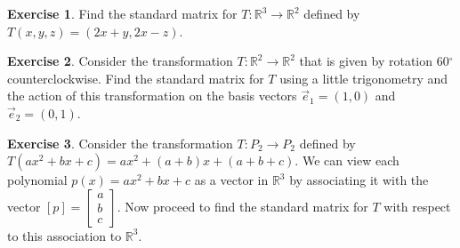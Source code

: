 \documentclass{beamer}
\newcommand{\R}{\mathbb{R}}
\newcommand{\fn}{\insertframenumber}
\theoremstyle{definition}
\newtheorem{exercise}{Exercise}
\renewcommand{\emph}[1]{{\color{blue}\texttt{#1}}}
\newenvironment{statementblock}[1]{%
	\setbeamercolor{block body}{bg=Gold!20}
	\setbeamercolor{block title}{bg=Gold}
	\begin{block}{\textbf{#1.}}}{\end{block}}
\begin{document}
\begin{frame}{\fn}
	\begin{exercise}
		Find the standard matrix for $T:\R^3\to\R^2$ defined by $T(x,y,z)=(2x+y,2x-z)$.
	\end{exercise}
	\begin{exercise}
		Consider the transformation $T:\R^2\to\R^2$ that is given by rotation 60$^\circ$ counterclockwise. Find the standard matrix for $T$ using a little trigonometry and the action of this transformation on the basis vectors $\vec e_1=(1,0)$ and $\vec e_2=(0,1)$.
	\end{exercise}
\end{frame}
\begin{frame}{\fn}
	\begin{exercise}
		Consider the transformation $T:P_2\to P_2$ defined by $T(ax^2+bx+c)=ax^2+(a+b)x+(a+b+c)$.
		We can view each polynomial $p(x)=ax^2+bx+c$ as a vector in $\R^3$ by associating it with the vector $[p]=\begin{bmatrix}a\\b\\c\end{bmatrix}$.  Now proceed to find the standard matrix for $T$ with respect to this association to $\R^3$.
	\end{exercise}
\end{frame}
\end{document}

